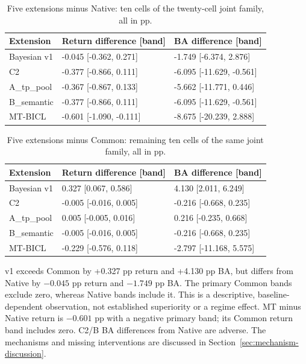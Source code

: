 \begin{table}[htbp]\centering\small{}\setlength{\tabcolsep}{4pt}
\caption[Complete joint-family contrasts against Native]{Five extensions minus Native: ten cells of the twenty-cell joint family, all in pp.}\label{tab:vsnative}
\begin{tabular}{@{}P{.17\linewidth}P{.36\linewidth}P{.36\linewidth}@{}}\toprule
Extension & Return difference [band] & BA difference [band]\\\midrule
Bayesian v1 & -0.045 {[}-0.362, 0.271{]} & -1.749 {[}-6.374, 2.876{]}\\
C2 & -0.377 {[}-0.866, 0.111{]} & -6.095 {[}-11.629, -0.561{]}\\
A\_\allowbreak{}tp\_\allowbreak{}pool & -0.367 {[}-0.867, 0.133{]} & -5.662 {[}-11.771, 0.446{]}\\
B\_\allowbreak{}semantic & -0.377 {[}-0.866, 0.111{]} & -6.095 {[}-11.629, -0.561{]}\\
MT-BICL & -0.601 {[}-1.090, -0.111{]} & -8.675 {[}-20.239, 2.888{]}\\
\bottomrule\end{tabular}\end{table}

\begin{table}[htbp]\centering\small{}\setlength{\tabcolsep}{4pt}
\caption[Complete joint-family contrasts against Common]{Five extensions minus Common: remaining ten cells of the same joint family, all in pp.}\label{tab:vscommon}
\begin{tabular}{@{}P{.17\linewidth}P{.36\linewidth}P{.36\linewidth}@{}}\toprule
Extension & Return difference [band] & BA difference [band]\\\midrule
Bayesian v1 & 0.327 {[}0.067, 0.586{]} & 4.130 {[}2.011, 6.249{]}\\
C2 & -0.005 {[}-0.016, 0.005{]} & -0.216 {[}-0.668, 0.235{]}\\
A\_\allowbreak{}tp\_\allowbreak{}pool & 0.005 {[}-0.005, 0.016{]} & 0.216 {[}-0.235, 0.668{]}\\
B\_\allowbreak{}semantic & -0.005 {[}-0.016, 0.005{]} & -0.216 {[}-0.668, 0.235{]}\\
MT-BICL & -0.229 {[}-0.576, 0.118{]} & -2.797 {[}-11.168, 5.575{]}\\
\bottomrule\end{tabular}\end{table}

v1 exceeds Common by +0.327 pp return and +4.130 pp BA, but differs from
Native by $-0.045$ pp return and $-1.749$ pp BA. The primary Common bands
exclude zero, whereas Native bands include it. This is a descriptive,
baseline-dependent observation, not established superiority or a regime
effect. MT minus Native return is $-0.601$ pp with a negative primary
band; its Common return band includes zero. C2/B BA differences from
Native are adverse. The mechanisms and missing interventions are discussed in
Section~\ref{sec:mechanism-discussion}.


